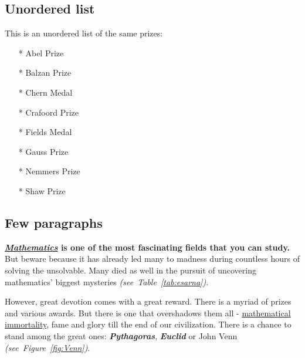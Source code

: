 \subsection{Unordered list}
This is an unordered list of the same prizes:
\begin{itemize}
    \item [*] Abel Prize
    \item [*] Balzan Prize
    \item [*] Chern Medal
    \item [*] Crafoord Prize
    \item [*] Fields Medal
    \item [*] Gauss Prize
    \item [*] Nemmers Prize
    \item [*] Shaw Prize
\end{itemize}

\subsection{Few paragraphs}
\vspace{0.5cm}\noindent \textbf{\emph{\underline{Mathematics}} is one of the most fascinating fields that you can study.} But beware because it has already led many to madness during countless hours of solving the unsolvable. Many died as well in the pursuit of uncovering mathematics' biggest mysteries \textit{(see~Table~\ref{tab:esarna})}.

However, great devotion comes with a great reward. There is a myriad of prizes and various awards. But there is one that overshadows them all - \underline{mathematical immortality}, fame and glory till the end of our civilization. There is a chance to stand among the great ones: \textbf{\textit{Pythagoras}}, \textbf{\textit{Euclid}} or John Venn \textit{(see~Figure~\ref{fig:Venn})}.